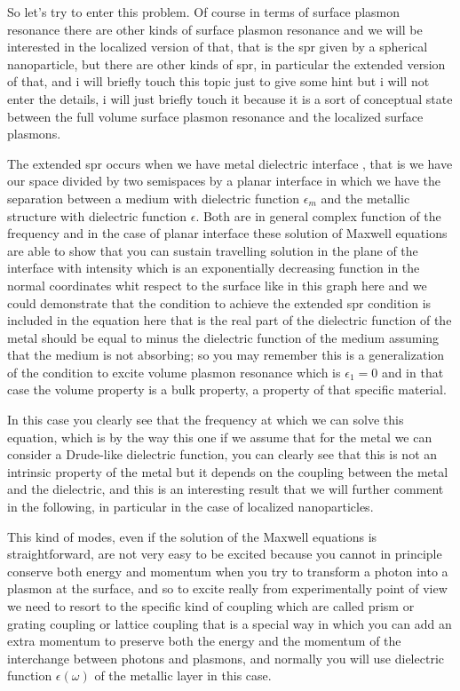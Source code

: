 \documentclass[../main/main.tex]{subfiles}
\begin{document}
So let's try to enter this problem. Of course in terms of surface plasmon resonance there are  other kinds of surface plasmon resonance and we will be interested in the localized version of that, that is the spr given by a spherical nanoparticle, but there are other kinds of spr, in particular the extended version of that, and i will briefly touch this topic just to give some hint but i will not enter the details, i will just briefly touch it because it is a sort of conceptual state between the full volume surface plasmon resonance and the localized surface plasmons.

The extended spr occurs when we have metal dielectric interface , that is we have our space divided by two semispaces by a planar interface in which we have the separation between a medium with dielectric function $\epsilon_m$ and the metallic structure with dielectric function $\epsilon$. Both are in general complex function of the frequency and in the case of planar interface these solution of Maxwell equations are able to show that you can sustain travelling solution in the plane of the interface with intensity which is an exponentially decreasing function in the normal coordinates whit respect to the surface like in this graph here and we could demonstrate that the condition to achieve the extended spr condition is included in the equation here that is the real part of the dielectric function of the metal should be equal to minus the dielectric function of the medium assuming that the medium is not absorbing; so you may remember this is a generalization of the condition to excite volume plasmon resonance which is $\epsilon_1=0$ and in that case the volume property is a bulk property, a property of that specific material.

In this case you clearly see that the frequency at which we can solve this equation, which is by the way this one if we assume that for the metal we can consider a Drude-like dielectric function, you can clearly see that this is not an intrinsic property of the metal but it depends on the coupling between the metal and the dielectric, and this is an interesting result that we will further comment in the following, in particular in the case of localized nanoparticles. 

This kind of modes, even if the solution of the Maxwell equations is straightforward, are not very easy to be excited because you cannot in principle conserve both energy and momentum when you try to transform a photon into a plasmon at the surface, and so to excite really from experimentally point of view we need to resort to the specific kind of coupling which are called prism or grating coupling or lattice coupling that is a special way in which you can add an extra momentum to preserve both the energy and the momentum of the interchange between photons and plasmons, and normally you will use dielectric function $\epsilon(\omega)$ of the metallic layer in this case. 
\end{document}
